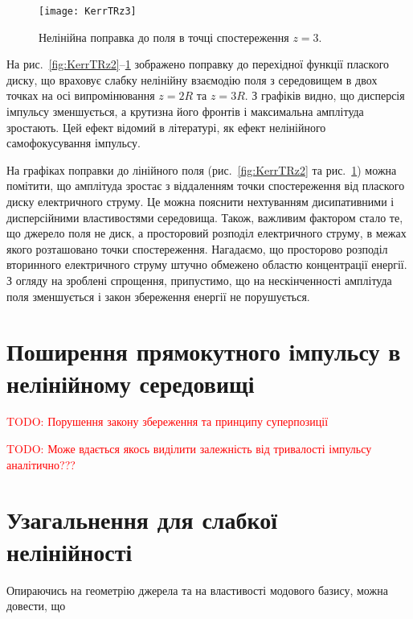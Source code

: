 \begin{figure}[htbp] \begin{center}
\texttt{[image: KerrTRz3]}
\caption{Нелінійна поправка до поля в точці спостереження $ z = 3 $.} 
\label{fig:KerrTRz3}
\end{center} \end{figure}

На рис.~\ref{fig:KerrTRz2}--\ref{fig:KerrTRz3} зображено поправку
до перехідної функції плаского диску, що враховує слабку нелінійну взаємодію 
поля з середовищем в двох точках на осі випромінювання $ z = 2R $ та $ z = 3R $.
З графіків видно, що дисперсія імпульсу зменшується, а крутизна його фронтів і
максимальна амплітуда зростають. Цей ефект відомий в літературі, як ефект 
нелінійного самофокусування імпульсу.

На графіках поправки до лінійного поля (рис.~\ref{fig:KerrTRz2} та 
рис.~\ref{fig:KerrTRz3}) можна помітити, що амплітуда зростає з віддаленням 
точки спостереження від плаского диску електричного струму. Це можна 
пояснити нехтуванням дисипативними і дисперсійними властивостями 
середовища. Також, важливим фактором стало те, що джерело поля не диск, 
а просторовий розподіл електричного струму, в межах якого розташовано точки 
спостереження. Нагадаємо, що просторово розподіл вторинного електричного 
струму штучно обмежено областю концентрації енергії. З огляду на зроблені 
спрощення, припустимо, що на нескінченності амплітуда поля зменшується і закон збереження енергії не порушується.

\section{Поширення прямокутного імпульсу в нелінійному середовищі}

\textcolor{red} {TODO: Порушення закону збереження та принципу суперпозиції}

\textcolor{red} {TODO: Може вдається якось виділити залежність від 
тривалості імпульсу аналітично???}

\section{Узагальнення для слабкої нелінійності}

Опираючись на геометрію джерела та на властивості модового базису, можна 
довести, що 

